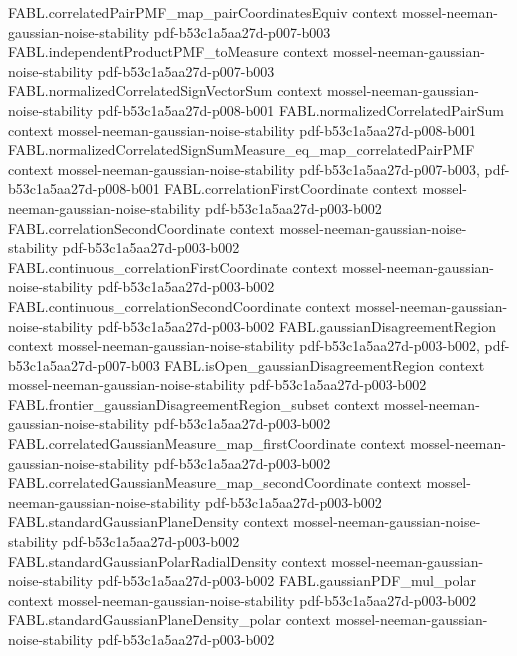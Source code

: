 \begin{theorem}
\proofstep
  {FABL.correlatedPairPMF_map_pairCoordinatesEquiv}
  {context}
  {mossel-neeman-gaussian-noise-stability}
  {pdf-b53c1a5aa27d-p007-b003}
\proofstep
  {FABL.independentProductPMF_toMeasure}
  {context}
  {mossel-neeman-gaussian-noise-stability}
  {pdf-b53c1a5aa27d-p007-b003}
\proofstep
  {FABL.normalizedCorrelatedSignVectorSum}
  {context}
  {mossel-neeman-gaussian-noise-stability}
  {pdf-b53c1a5aa27d-p008-b001}
\proofstep
  {FABL.normalizedCorrelatedPairSum}
  {context}
  {mossel-neeman-gaussian-noise-stability}
  {pdf-b53c1a5aa27d-p008-b001}
\proofstep
  {FABL.normalizedCorrelatedSignSumMeasure_eq_map_correlatedPairPMF}
  {context}
  {mossel-neeman-gaussian-noise-stability}
  {pdf-b53c1a5aa27d-p007-b003,
    pdf-b53c1a5aa27d-p008-b001}
\proofstep
  {FABL.correlationFirstCoordinate}
  {context}
  {mossel-neeman-gaussian-noise-stability}
  {pdf-b53c1a5aa27d-p003-b002}
\proofstep
  {FABL.correlationSecondCoordinate}
  {context}
  {mossel-neeman-gaussian-noise-stability}
  {pdf-b53c1a5aa27d-p003-b002}
\proofstep
  {FABL.continuous_correlationFirstCoordinate}
  {context}
  {mossel-neeman-gaussian-noise-stability}
  {pdf-b53c1a5aa27d-p003-b002}
\proofstep
  {FABL.continuous_correlationSecondCoordinate}
  {context}
  {mossel-neeman-gaussian-noise-stability}
  {pdf-b53c1a5aa27d-p003-b002}
\proofstep
  {FABL.gaussianDisagreementRegion}
  {context}
  {mossel-neeman-gaussian-noise-stability}
  {pdf-b53c1a5aa27d-p003-b002,
    pdf-b53c1a5aa27d-p007-b003}
\proofstep
  {FABL.isOpen_gaussianDisagreementRegion}
  {context}
  {mossel-neeman-gaussian-noise-stability}
  {pdf-b53c1a5aa27d-p003-b002}
\proofstep
  {FABL.frontier_gaussianDisagreementRegion_subset}
  {context}
  {mossel-neeman-gaussian-noise-stability}
  {pdf-b53c1a5aa27d-p003-b002}
\proofstep
  {FABL.correlatedGaussianMeasure_map_firstCoordinate}
  {context}
  {mossel-neeman-gaussian-noise-stability}
  {pdf-b53c1a5aa27d-p003-b002}
\proofstep
  {FABL.correlatedGaussianMeasure_map_secondCoordinate}
  {context}
  {mossel-neeman-gaussian-noise-stability}
  {pdf-b53c1a5aa27d-p003-b002}
\proofstep
  {FABL.standardGaussianPlaneDensity}
  {context}
  {mossel-neeman-gaussian-noise-stability}
  {pdf-b53c1a5aa27d-p003-b002}
\proofstep
  {FABL.standardGaussianPolarRadialDensity}
  {context}
  {mossel-neeman-gaussian-noise-stability}
  {pdf-b53c1a5aa27d-p003-b002}
\proofstep
  {FABL.gaussianPDF_mul_polar}
  {context}
  {mossel-neeman-gaussian-noise-stability}
  {pdf-b53c1a5aa27d-p003-b002}
\proofstep
  {FABL.standardGaussianPlaneDensity_polar}
  {context}
  {mossel-neeman-gaussian-noise-stability}
  {pdf-b53c1a5aa27d-p003-b002}

\end{theorem}
